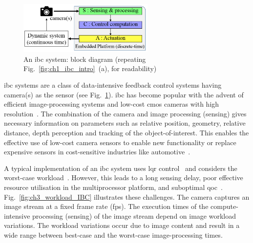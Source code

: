 \begin{figure}[tb]
\vspace*{-1.5ex}
    \centerline{
     \includegraphics[width=0.6\textwidth]{images/IBC_bd2.png}
    }
    \vspace*{-1.5ex}
    \caption{An \gls{ibc} system: block diagram (repeating Fig.~\ref{fig:ch1_ibc_intro}~(a), for readability)}
    \label{fig:ch3_IBC_block_diagram}
\end{figure}

\Gls{ibc} systems are a class of data-intensive feedback control systems having camera(s) as the sensor (see Fig.~\ref{fig:ch3_IBC_block_diagram}). \Gls{ibc} has become popular with the advent of efficient image-processing systems and low-cost \gls{cmos} cameras with high resolution~\cite{corke2017robotics}\cite{van2018data}. The combination of the camera and image processing (sensing) gives necessary information on parameters such as relative position, geometry, relative distance, depth perception and tracking of the object-of-interest. This enables the effective use of low-cost camera sensors to enable new functionality or replace expensive sensors in cost-sensitive industries like automotive~\cite{corke2017robotics}\cite{pendleton2017perception}\cite{saidi2018future}.

A typical implementation of an \gls{ibc} system uses \gls{lqr} control~\cite{dorf2011modern} and considers the worst-case workload~\cite{saidi2018future}.
However, this leads to a long sensing delay, poor effective resource utilisation in the multiprocessor platform, and suboptimal \gls{qoc}~\cite{saidi2018future}. 
Fig.~\ref{fig:ch3_workload_IBC} illustrates these challenges.
The camera captures an image stream at a fixed frame rate (\gls{fps}). 
The execution times of the compute-intensive processing (sensing) of the image stream depend on image workload variations. The workload variations occur due to image content and result in a wide range between best-case and the worst-case image-processing times. 


